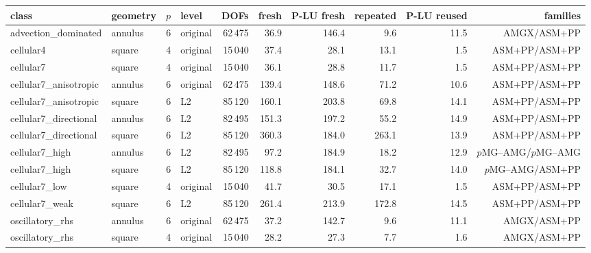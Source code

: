 \begin{tabular}{llrlrrrrrr}
\toprule
class & geometry & $p$ & level & DOFs & fresh & P-LU fresh & repeated & P-LU reused & families\\
\midrule
advection\_dominated & annulus & 6 & original & 62\,475 & 36.9 & 146.4 & 9.6 & 11.5 & AMGX/ASM+PP\\
cellular4 & square & 4 & original & 15\,040 & 37.4 & 28.1 & 13.1 & 1.5 & ASM+PP/ASM+PP\\
cellular7 & square & 4 & original & 15\,040 & 36.1 & 28.8 & 11.7 & 1.5 & ASM+PP/ASM+PP\\
cellular7\_anisotropic & annulus & 6 & original & 62\,475 & 139.4 & 148.6 & 71.2 & 10.6 & ASM+PP/ASM+PP\\
cellular7\_anisotropic & square & 6 & L2 & 85\,120 & 160.1 & 203.8 & 69.8 & 14.1 & ASM+PP/ASM+PP\\
cellular7\_directional & annulus & 6 & L2 & 82\,495 & 151.3 & 197.2 & 55.2 & 14.9 & ASM+PP/ASM+PP\\
cellular7\_directional & square & 6 & L2 & 85\,120 & 360.3 & 184.0 & 263.1 & 13.9 & ASM+PP/ASM+PP\\
cellular7\_high & annulus & 6 & L2 & 82\,495 & 97.2 & 184.9 & 18.2 & 12.9 & $p$MG--AMG/$p$MG--AMG\\
cellular7\_high & square & 6 & L2 & 85\,120 & 118.8 & 184.1 & 32.7 & 14.0 & $p$MG--AMG/ASM+PP\\
cellular7\_low & square & 4 & original & 15\,040 & 41.7 & 30.5 & 17.1 & 1.5 & ASM+PP/ASM+PP\\
cellular7\_weak & square & 6 & L2 & 85\,120 & 261.4 & 213.9 & 172.8 & 14.5 & ASM+PP/ASM+PP\\
oscillatory\_rhs & annulus & 6 & original & 62\,475 & 37.2 & 142.7 & 9.6 & 11.1 & AMGX/ASM+PP\\
oscillatory\_rhs & square & 4 & original & 15\,040 & 28.2 & 27.3 & 7.7 & 1.6 & AMGX/ASM+PP\\
\bottomrule
\end{tabular}
